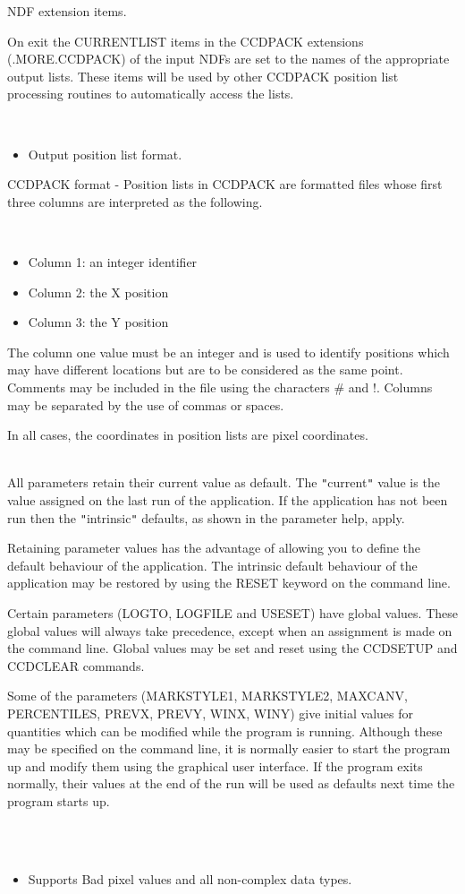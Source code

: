 \documentclass[twoside,11pt]{article}
\newcommand{\htmlref}[2]{#1}
\renewcommand{\_}{\texttt{\symbol{95}}}
\newcommand{\xroutine}[1]{\htmlref{{\sc #1}}{#1}}
\newcommand{\sstdiytopic}[2]{\item[#1:] \mbox{} \\[1.3ex] #2}
\newcommand{\sstimplementationstatus}[1]{
   \item[{Implementation Status:}] \mbox{} \\[1.3ex] #1}
\newcommand{\sstitemlist}[1]{
  \mbox{} \\
  \vspace{-3.5ex}
  \begin{itemize}
     #1
  \end{itemize}
}
\newcommand{\sstitem}{\item}
\newcommand{\sstdiytopic}[2]{\item[{#1:}] #2 }
\newcommand{\sstimplementationstatus}[1]{
      \item[Implementation Status:] #1
   }
\newcommand{\sstitemlist}[1]{
      \begin{itemize}
         #1
      \end{itemize}
      \\
   }
\newcommand{\sstitem}{\item}
\begin{document}
{{{         \sstitem
         NDF extension items.

      }
        On exit the CURRENT\_LIST items in the CCDPACK extensions
        (.MORE.CCDPACK) of the input NDFs are set to the names of the
        appropriate output lists. These items will be used by other
        CCDPACK position list processing routines to automatically
        access the lists.

      \sstitemlist{

         \sstitem
         Output position list format.

      }
        CCDPACK format - Position lists in CCDPACK are formatted files
        whose first three columns are interpreted as the following.

      \sstitemlist{

         \sstitem
              Column 1: an integer identifier

         \sstitem
              Column 2: the X position

         \sstitem
              Column 3: the Y position

      }
        The column one value must be an integer and is used to identify
        positions which may have different locations but are to be
        considered as the same point. Comments may be included in the
        file using the characters \# and !. Columns may be separated by
        the use of commas or spaces.

        In all cases, the coordinates in position lists are pixel
        coordinates.
   }
   \sstdiytopic{
      Behaviour of parameters
   }{
      All parameters retain their current value as default. The
      {\tt "}current{\tt "} value is the value assigned on the last run of the
      application. If the application has not been run then the
      {\tt "}intrinsic{\tt "} defaults, as shown in the parameter help, apply.

      Retaining parameter values has the advantage of allowing you to
      define the default behaviour of the application.  The intrinsic
      default behaviour of the application may be restored by using the
      RESET keyword on the command line.

      Certain parameters (LOGTO, LOGFILE and USESET) have global values.
      These global values will always take precedence, except when an
      assignment is made on the command line.  Global values may be set
      and reset using the \xroutine{CCDSETUP} and \xroutine{CCDCLEAR} commands.

      Some of the parameters (MARKSTYLE1, MARKSTYLE2, MAXCANV, PERCENTILES,
      PREVX, PREVY, WINX, WINY)  give initial values for quantities which
      can be modified while the program is running.  Although these may be
      specified on the command line, it is normally easier to start
      the program up and modify them using the graphical user interface.
      If the program exits normally, their values at the end of the run
      will be used as defaults next time the program starts up.
   }
   \sstimplementationstatus{
      \sstitemlist{

         \sstitem
         Supports Bad pixel values and all non-complex data types.
      }
   }
}
\end{document}
